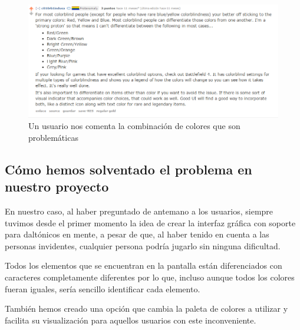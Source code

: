 \begin{figure}[H]
		\includegraphics[width=\textwidth,height=\textheight,keepaspectratio]{./img/redditcolorblind3.png}
	\caption{Un usuario nos comenta la combinación de colores que son problemáticas}
	\label{fig:roomsgamecolorblind3}
\end{figure}

\subsection{Cómo hemos solventado el problema en nuestro proyecto}
\label{sec:solventadodaltonicos}

En nuestro caso, al haber preguntado de antemano a los usuarios, siempre tuvimos desde el primer momento la idea de crear la interfaz gráfica con soporte para daltónicos en mente, a pesar de que, al haber tenido en cuenta a las personas invidentes, cualquier persona podría jugarlo sin ninguna dificultad.

Todos los elementos que se encuentran en la pantalla están diferenciados con caracteres completamente diferentes por lo que, incluso aunque todos los colores fueran iguales, sería sencillo identificar cada elemento. 

También hemos creado una opción que cambia la paleta de colores a utilizar y facilita su visualización para aquellos usuarios con este inconveniente.

